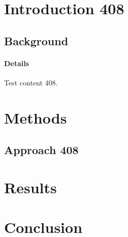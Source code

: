 \documentclass{article}
\begin{document}
\section{Introduction 408}
\subsection{Background}
\paragraph{Details} Test content 408.
\section{Methods}
\subsection{Approach 408}
\section{Results}
\section{Conclusion}
\end{document}
